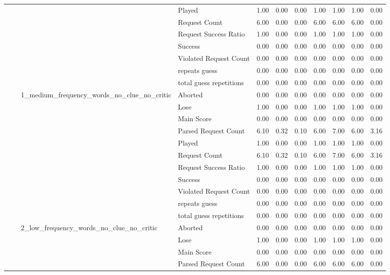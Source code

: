 \begin{tabular}{llllrrrrrrr}
 &  &  & Played & 1.00 & 0.00 & 0.00 & 1.00 & 1.00 & 1.00 & 0.00 \\
 &  &  & Request Count & 6.00 & 0.00 & 0.00 & 6.00 & 6.00 & 6.00 & 0.00 \\
 &  &  & Request Success Ratio & 1.00 & 0.00 & 0.00 & 1.00 & 1.00 & 1.00 & 0.00 \\
 &  &  & Success & 0.00 & 0.00 & 0.00 & 0.00 & 0.00 & 0.00 & 0.00 \\
 &  &  & Violated Request Count & 0.00 & 0.00 & 0.00 & 0.00 & 0.00 & 0.00 & 0.00 \\
 &  &  & repeats guess & 0.00 & 0.00 & 0.00 & 0.00 & 0.00 & 0.00 & 0.00 \\
 &  &  & total guess repetitions & 0.00 & 0.00 & 0.00 & 0.00 & 0.00 & 0.00 & 0.00 \\
\cline{3-11}
 &  & \multirow[t]{11}{*}{1_medium_frequency_words_no_clue_no_critic} & Aborted & 0.00 & 0.00 & 0.00 & 0.00 & 0.00 & 0.00 & 0.00 \\
 &  &  & Lose & 1.00 & 0.00 & 0.00 & 1.00 & 1.00 & 1.00 & 0.00 \\
 &  &  & Main Score & 0.00 & 0.00 & 0.00 & 0.00 & 0.00 & 0.00 & 0.00 \\
 &  &  & Parsed Request Count & 6.10 & 0.32 & 0.10 & 6.00 & 7.00 & 6.00 & 3.16 \\
 &  &  & Played & 1.00 & 0.00 & 0.00 & 1.00 & 1.00 & 1.00 & 0.00 \\
 &  &  & Request Count & 6.10 & 0.32 & 0.10 & 6.00 & 7.00 & 6.00 & 3.16 \\
 &  &  & Request Success Ratio & 1.00 & 0.00 & 0.00 & 1.00 & 1.00 & 1.00 & 0.00 \\
 &  &  & Success & 0.00 & 0.00 & 0.00 & 0.00 & 0.00 & 0.00 & 0.00 \\
 &  &  & Violated Request Count & 0.00 & 0.00 & 0.00 & 0.00 & 0.00 & 0.00 & 0.00 \\
 &  &  & repeats guess & 0.00 & 0.00 & 0.00 & 0.00 & 0.00 & 0.00 & 0.00 \\
 &  &  & total guess repetitions & 0.00 & 0.00 & 0.00 & 0.00 & 0.00 & 0.00 & 0.00 \\
\cline{3-11}
 &  & \multirow[t]{11}{*}{2_low_frequency_words_no_clue_no_critic} & Aborted & 0.00 & 0.00 & 0.00 & 0.00 & 0.00 & 0.00 & 0.00 \\
 &  &  & Lose & 1.00 & 0.00 & 0.00 & 1.00 & 1.00 & 1.00 & 0.00 \\
 &  &  & Main Score & 0.00 & 0.00 & 0.00 & 0.00 & 0.00 & 0.00 & 0.00 \\
 &  &  & Parsed Request Count & 6.00 & 0.00 & 0.00 & 6.00 & 6.00 & 6.00 & 0.00 \\

\end{tabular}
